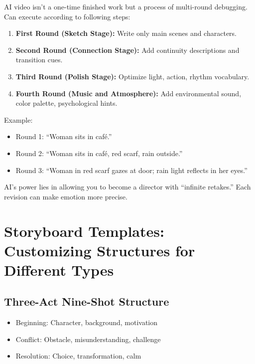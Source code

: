 AI video isn't a one-time finished work but a process of multi-round debugging. Can execute according to following steps:

\begin{enumerate}
\item \textbf{First Round (Sketch Stage):} Write only main scenes and characters.

\item \textbf{Second Round (Connection Stage):} Add continuity descriptions and transition cues.

\item \textbf{Third Round (Polish Stage):} Optimize light, action, rhythm vocabulary.

\item \textbf{Fourth Round (Music and Atmosphere):} Add environmental sound, color palette, psychological hints.
\end{enumerate}

\begin{Prompt}
Example:

\begin{itemize}
\item Round 1: ``Woman sits in café.''
\item Round 2: ``Woman sits in café, red scarf, rain outside.''
\item Round 3: ``Woman in red scarf gazes at door; rain light reflects in her eyes.''
\end{itemize}
\end{Prompt}

AI's power lies in allowing you to become a director with ``infinite retakes.'' Each revision can make emotion more precise.

\section{Storyboard Templates: Customizing Structures for Different Types}
\label{sec:storyboard-templates}

\subsection{Three-Act Nine-Shot Structure}

\begin{itemize}
\item Beginning: Character, background, motivation
\item Conflict: Obstacle, misunderstanding, challenge
\item Resolution: Choice, transformation, calm
\end{itemize}

